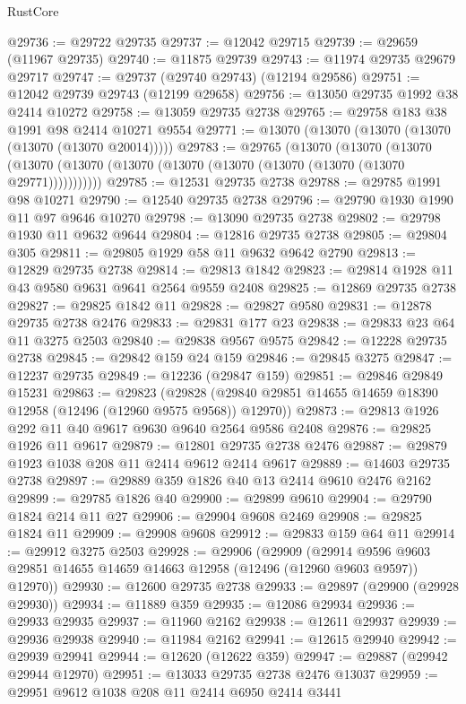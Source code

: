 \begin{lexlean}{RustCore}
\begin{coremodule}
@29736 := @29722 @29735
@29737 := @12042 @29715
@29739 := @29659 (@11967 @29735)
@29740 := @11875 @29739
@29743 := @11974 @29735 @29679 @29717
@29747 := @29737 (@29740 @29743) (@12194 @29586)
@29751 := @12042 @29739 @29743 (@12199 @29658)
@29756 := @13050 @29735 @1992 @38 @2414 @10272
@29758 := @13059 @29735 @2738
@29765 := @29758 @183 @38 @1991 @98 @2414 @10271 @9554
@29771 := @13070 (@13070 (@13070 (@13070 (@13070 (@13070 @20014)))))
@29783 := @29765
    (@13070
      (@13070
        (@13070 (@13070 (@13070 (@13070 (@13070 (@13070 (@13070 (@13070 (@13070 @29771)))))))))))
@29785 := @12531 @29735 @2738
@29788 := @29785 @1991 @98 @10271
@29790 := @12540 @29735 @2738
@29796 := @29790 @1930 @1990 @11 @97 @9646 @10270
@29798 := @13090 @29735 @2738
@29802 := @29798 @1930 @11 @9632 @9644
@29804 := @12816 @29735 @2738
@29805 := @29804 @305
@29811 := @29805 @1929 @58 @11 @9632 @9642 @2790
@29813 := @12829 @29735 @2738
@29814 := @29813 @1842
@29823 := @29814 @1928 @11 @43 @9580 @9631 @9641 @2564 @9559 @2408
@29825 := @12869 @29735 @2738
@29827 := @29825 @1842 @11
@29828 := @29827 @9580
@29831 := @12878 @29735 @2738 @2476
@29833 := @29831 @177 @23
@29838 := @29833 @23 @64 @11 @3275 @2503
@29840 := @29838 @9567 @9575
@29842 := @12228 @29735 @2738
@29845 := @29842 @159 @24 @159
@29846 := @29845 @3275
@29847 := @12237 @29735
@29849 := @12236 (@29847 @159)
@29851 := @29846 @29849 @15231
@29863 := @29823
    (@29828 (@29840 @29851 @14655 @14659 @18390 @12958 (@12496 (@12960 @9575 @9568)) @12970))
@29873 := @29813 @1926 @292 @11 @40 @9617 @9630 @9640 @2564 @9586 @2408
@29876 := @29825 @1926 @11 @9617
@29879 := @12801 @29735 @2738 @2476
@29887 := @29879 @1923 @1038 @208 @11 @2414 @9612 @2414 @9617
@29889 := @14603 @29735 @2738
@29897 := @29889 @359 @1826 @40 @13 @2414 @9610 @2476 @2162
@29899 := @29785 @1826 @40
@29900 := @29899 @9610
@29904 := @29790 @1824 @214 @11 @27
@29906 := @29904 @9608 @2469
@29908 := @29825 @1824 @11
@29909 := @29908 @9608
@29912 := @29833 @159 @64 @11
@29914 := @29912 @3275 @2503
@29928 := @29906
    (@29909
      (@29914 @9596 @9603 @29851 @14655 @14659 @14663 @12958 (@12496 (@12960 @9603 @9597)) @12970))
@29930 := @12600 @29735 @2738
@29933 := @29897 (@29900 (@29928 @29930))
@29934 := @11889 @359
@29935 := @12086 @29934
@29936 := @29933 @29935
@29937 := @11960 @2162
@29938 := @12611 @29937
@29939 := @29936 @29938
@29940 := @11984 @2162
@29941 := @12615 @29940
@29942 := @29939 @29941
@29944 := @12620 (@12622 @359)
@29947 := @29887 (@29942 @29944 @12970)
@29951 := @13033 @29735 @2738 @2476 @13037
@29959 := @29951 @9612 @1038 @208 @11 @2414 @6950 @2414 @3441

\end{coremodule}
\end{lexlean}
